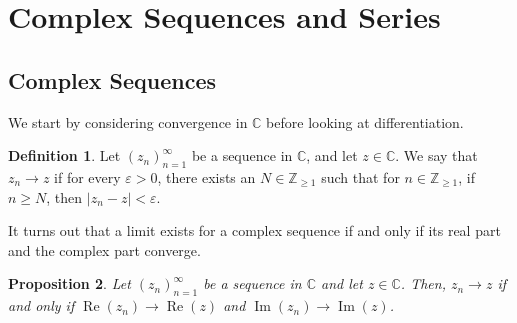 \documentclass[a4paper, openany]{memoir}
\theoremstyle{definition}
\newtheorem{definition}{Definition}[section]
\theoremstyle{plain}
\newtheorem{proposition}[definition]{Proposition}
\begin{document}
\section{Complex Sequences and Series}
\subsection{Complex Sequences}
We start by considering convergence in $\mathbb{C}$ before looking at differentiation.
\begin{definition}
Let $(z_n)_{n=1}^{\infty}$ be a sequence in $\mathbb{C}$, and let $z \in \mathbb{C}$. We say that $z_n \to z$ if for every $\varepsilon > 0$, there exists an $N \in \mathbb{Z}_{\geqslant 1}$ such that for $n \in \mathbb{Z}_{\geqslant 1}$, if $n \geqslant N$, then $|z_n - z| < \varepsilon$.
\end{definition}
\noindent It turns out that a limit exists for a complex sequence if and only if its real part and the complex part converge.
\begin{proposition}
Let $(z_n)_{n=1}^{\infty}$ be a sequence in $\mathbb{C}$ and let $z \in \mathbb{C}$. Then, $z_n \to z$ if and only if $\operatorname{Re}(z_n) \to \operatorname{Re}(z)$ and $\operatorname{Im}(z_n) \to \operatorname{Im}(z)$.
\end{proposition}
    
\end{document}
